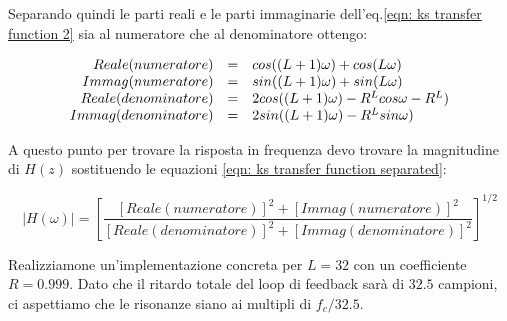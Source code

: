 Separando quindi le parti reali e le parti immaginarie dell'eq.\ref{eqn: ks
transfer function 2} sia al numeratore che al denominatore ottengo:

\begin{equation}\label{eqn: ks transfer function separated}
	\begin{array}{r c l}
		Reale ( numeratore ) & = & cos ( ( L + 1 ) \omega ) + cos ( L \omega )\\
		Immag ( numeratore ) & = & sin ( ( L + 1 ) \omega ) + sin ( L \omega )\\
		Reale ( denominatore ) & = & 2 cos ( ( L + 1 ) \omega ) - R^{L} cos \omega - R^{L} )\\
		Immag ( denominatore ) & = & 2 sin ( ( L + 1 ) \omega ) - R^{L} sin \omega )\\
	\end{array}
\end{equation}

A questo punto per trovare la risposta in frequenza devo trovare la
magnitudine di $H(z)$ sostituendo le equazioni \ref{eqn: ks transfer function separated}:

\begin{equation}\label{eqn: ks magnitude response}
				| H ( \omega ) | = \left [ \frac{[ Reale (numeratore) ]^{2} + [ Immag (numeratore) ]^{2}}{[ Reale (denominatore) ]^{2} + [ Immag (denominatore) ]^{2}} \right ]^{1/2}
\end{equation}

Realizziamone un'implementazione concreta per $L = 32$ con un coefficiente $R = 0.999$.
Dato che il ritardo totale del loop di feedback sar\`a di $32.5$ campioni,
ci aspettiamo che le risonanze siano ai multipli di $f_c / 32.5$.
